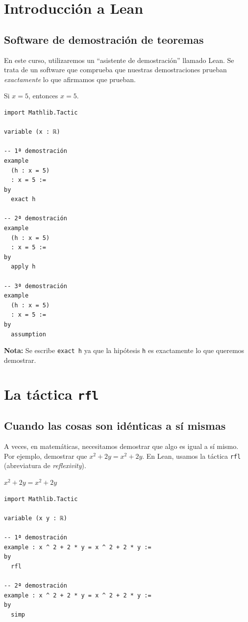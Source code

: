 \section{Introducción a Lean}

\subsection*{Software de demostración de teoremas}

En este curso, utilizaremos un ``asistente de demostración'' llamado
Lean. Se trata de un software que comprueba que nuestras demostraciones
prueban \textit{exactamente} lo que afirmamos que prueban.

\begin{theorem}
Si $x = 5$, entonces $x = 5$.
\end{theorem}

\begin{verbatim}
import Mathlib.Tactic

variable (x : ℝ)

-- 1ª demostración
example
  (h : x = 5)
  : x = 5 :=
by
  exact h

-- 2ª demostración
example
  (h : x = 5)
  : x = 5 :=
by
  apply h

-- 3ª demostración
example
  (h : x = 5)
  : x = 5 :=
by
  assumption
\end{verbatim}

\textbf{Nota:} Se escribe \texttt{exact h} ya que la hipótesis
\texttt{h} es exactamente lo que queremos demostrar.

\section{La táctica \texttt{rfl}}

\subsection*{Cuando las cosas son idénticas a sí mismas}

A veces, en matemáticas, necesitamos demostrar que algo es igual a sí
mismo. Por ejemplo, demostrar que $x^2 + 2y = x^2 + 2y$. En Lean, usamos
la táctica \texttt{rfl} (abreviatura de \textit{reflexivity}).

\begin{theorem}
\( x^2 + 2y = x^2 + 2y \)
\end{theorem}

\begin{verbatim}
import Mathlib.Tactic

variable (x y : ℝ)

-- 1ª demostración
example : x ^ 2 + 2 * y = x ^ 2 + 2 * y :=
by
  rfl

-- 2ª demostración
example : x ^ 2 + 2 * y = x ^ 2 + 2 * y :=
by
  simp
\end{verbatim}

